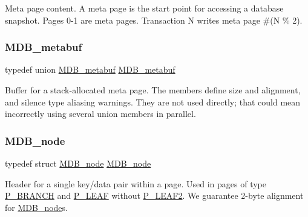 Meta page content. A meta page is the start point for accessing a database snapshot. Pages 0-\/1 are meta pages. Transaction N writes meta page \#(N \% 2). \mbox{\label{group__internal_gab4038dee16737a7eae5b26ea0b7bc3b9}} 
\subsubsection{\texorpdfstring{M\+D\+B\+\_\+metabuf}{MDB\_metabuf}}
{\footnotesize\ttfamily typedef union \mbox{\hyperlink{union_m_d_b__metabuf}{M\+D\+B\+\_\+metabuf}}  \mbox{\hyperlink{union_m_d_b__metabuf}{M\+D\+B\+\_\+metabuf}}}

Buffer for a stack-\/allocated meta page. The members define size and alignment, and silence type aliasing warnings. They are not used directly; that could mean incorrectly using several union members in parallel. \mbox{\label{group__internal_gaab9ae9db09d810de380a91cbe31b7455}} 
\subsubsection{\texorpdfstring{M\+D\+B\+\_\+node}{MDB\_node}}
{\footnotesize\ttfamily typedef struct \mbox{\hyperlink{struct_m_d_b__node}{M\+D\+B\+\_\+node}}  \mbox{\hyperlink{struct_m_d_b__node}{M\+D\+B\+\_\+node}}}

Header for a single key/data pair within a page. Used in pages of type \mbox{\hyperlink{group__mdb__page_gad6639bfcad26dbcbf7970dfa28f1a930}{P\+\_\+\+B\+R\+A\+N\+CH}} and \mbox{\hyperlink{group__mdb__page_gac85fb59a9a2eda0d33e58b23a7ca019a}{P\+\_\+\+L\+E\+AF}} without \mbox{\hyperlink{group__mdb__page_ga9c80486a549b2efbd5561cdd4df238c4}{P\+\_\+\+L\+E\+A\+F2}}. We guarantee 2-\/byte alignment for \textquotesingle{}\mbox{\hyperlink{struct_m_d_b__node}{M\+D\+B\+\_\+node}}\textquotesingle{}s. \mbox{\label{group__internal_gaae1a99b26a7daa2324c1cc854d4f1bae}} 
